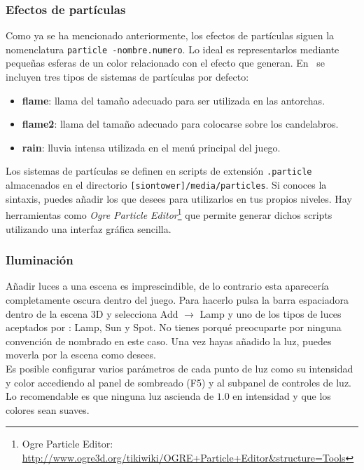 \documentclass[a4paper,11pt]{article}
\begin{document}
\subsubsection{Efectos de partículas}

Como ya se ha mencionado anteriormente, los efectos de partículas siguen
la nomenclatura \texttt{particle -nombre.numero}. Lo ideal es representarlos
mediante pequeñas esferas de un color relacionado con el efecto que generan.
En \juego\ se incluyen tres tipos de sistemas de partículas por defecto:

\begin{itemize}
    \itemsep0em
    \item \textbf{flame}: llama del tamaño adecuado para ser utilizada en las antorchas.
    \item \textbf{flame2}: llama del tamaño adecuado para colocarse sobre los candelabros.
    \item \textbf{rain}: lluvia intensa utilizada en el menú principal del juego.
\end{itemize}


Los sistemas de partículas se definen en scripts de extensión \texttt{.particle}
almacenados en el directorio \texttt{[siontower]/media/particles}. Si conoces
la sintaxis, puedes añadir los que desees para utilizarlos en tus propios niveles.
Hay herramientas como \textit{Ogre Particle Editor}\footnote{Ogre Particle Editor: \url{http://www.ogre3d.org/tikiwiki/OGRE+Particle+Editor&structure=Tools}}
que permite generar dichos scripts utilizando una interfaz gráfica sencilla.

\subsubsection{Iluminación}

Añadir luces a una escena es imprescindible, de lo contrario esta aparecería
completamente oscura dentro del juego. Para hacerlo pulsa la barra
espaciadora dentro de la escena 3D y selecciona Add $\rightarrow$ Lamp
y uno de los tipos de luces aceptados por \juego: Lamp, Sun y Spot.
No tienes porqué preocuparte por ninguna convención de nombrado en este caso.
Una vez hayas añadido la luz, puedes moverla por la escena como desees.\\

Es posible configurar varios parámetros de cada punto de luz como su intensidad
y color accediendo al panel de sombreado (F5) y al subpanel de controles
de luz. Lo recomendable es que ninguna luz ascienda de $1.0$ en intensidad
y que los colores sean suaves.
\end{document}
